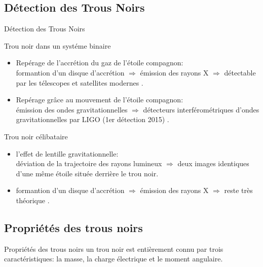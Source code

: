 \documentclass{beamer}
\begin{document}
%
\subsection{Détection des Trous Noirs }
\begin{frame}{Détection des Trous Noirs}


\begin{block}{Trou noir dans un systéme binaire}
\begin{itemize}
	\item Repérage de l'accrétion du gaz de l'étoile compagnon:\\
	
	formantion d'un disque d'accrétion $\Rightarrow$ émission des rayons X $\Rightarrow$ détectable par les télescopes et satellites modernes .
	\item    Repérage grâce au mouvement de l'étoile compagnon:\\
	émission des ondes gravitationnelles $\Rightarrow$
	détecteurs interférométriques d'ondes gravitationnelles par LIGO  (1er détection 2015) .
\end{itemize}
\end{block}
	\begin{block}{Trou noir célibataire}
		\begin{itemize}
		\item l'effet de lentille gravitationnelle:\\
	déviation de la trajectoire des rayons lumineux  $\Rightarrow$ deux images identiques d'une m\^{e}me étoile située derrière le trou noir. 
		\item formantion d'un disque d'accrétion $\Rightarrow$ émission des rayons X $\Rightarrow$ reste  très théorique .

\end{itemize}
\end{block}
\end{frame}
\subsection{Propriétés des trous noirs}
\begin{frame}
\begin{block}{Propriétés des trous noirs}
un trou noir est entièrement connu par  trois caractéristiques: la masse, la charge électrique et le moment angulaire.
\end{block}



\end{frame}
\end{document}
